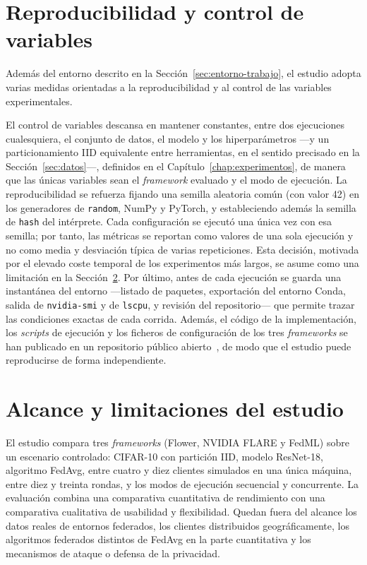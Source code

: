 \section{Reproducibilidad y control de variables}\label{sec:reproducibilidad}

Además del entorno descrito en la Sección~\ref{sec:entorno-trabajo}, el estudio adopta varias
medidas orientadas a la reproducibilidad y al control de las variables experimentales.

El control de variables descansa en mantener constantes, entre dos ejecuciones cualesquiera, el
conjunto de datos, el modelo y los hiperparámetros —y un particionamiento IID equivalente entre
herramientas, en el sentido precisado en la Sección~\ref{sec:datos}—, definidos en el
Capítulo~\ref{chap:experimentos}, de manera que las únicas variables sean el \textit{framework}
evaluado y el modo de ejecución. La reproducibilidad se refuerza fijando una semilla aleatoria
común (con valor 42) en los generadores de \texttt{random}, NumPy y PyTorch, y estableciendo
además la semilla de \texttt{hash} del intérprete. Cada configuración se ejecutó una única vez con
esa semilla; por tanto, las métricas se reportan como valores de una sola ejecución y no como
media y desviación típica de varias repeticiones. Esta decisión, motivada por el elevado coste
temporal de los experimentos más largos, se asume como una limitación en la
Sección~\ref{sec:alcance-limitaciones}. Por último, antes de cada ejecución se guarda una
instantánea del entorno —listado de paquetes, exportación del entorno Conda, salida de
\texttt{nvidia-smi} y de \texttt{lscpu}, y revisión del repositorio— que permite trazar las
condiciones exactas de cada corrida. Además, el código de la implementación, los \textit{scripts} de ejecución y los ficheros de configuración de los tres \textit{frameworks} se han publicado en un repositorio público abierto~\parencite{lujan2026repo}, de modo que el estudio puede reproducirse de forma independiente.

\section{Alcance y limitaciones del estudio}\label{sec:alcance-limitaciones}

El estudio compara tres \textit{frameworks} (Flower, NVIDIA FLARE y FedML) sobre un escenario
controlado: CIFAR-10 con partición IID, modelo ResNet-18, algoritmo FedAvg, entre cuatro y diez
clientes simulados en una única máquina, entre diez y treinta rondas, y los modos de ejecución
secuencial y concurrente. La evaluación combina una comparativa cuantitativa de rendimiento con
una comparativa cualitativa de usabilidad y flexibilidad. Quedan fuera del alcance los datos
reales de entornos federados, los clientes distribuidos geográficamente, los algoritmos federados
distintos de FedAvg en la parte cuantitativa y los mecanismos de ataque o defensa de la
privacidad.

